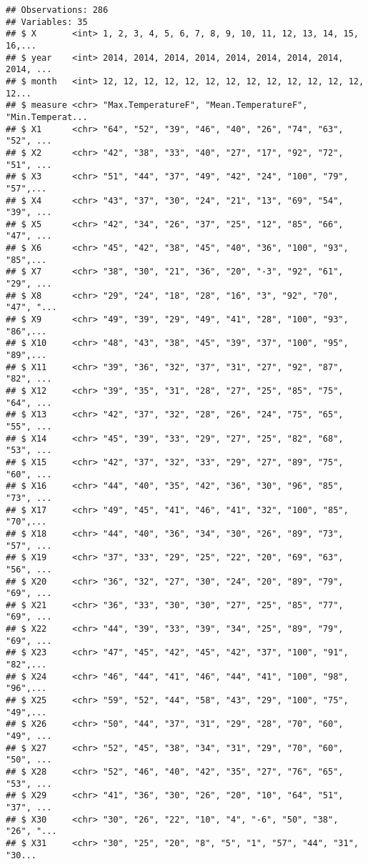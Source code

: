 \documentclass[]{article}
\begin{document}
\begin{verbatim}
## Observations: 286
## Variables: 35
## $ X       <int> 1, 2, 3, 4, 5, 6, 7, 8, 9, 10, 11, 12, 13, 14, 15, 16,...
## $ year    <int> 2014, 2014, 2014, 2014, 2014, 2014, 2014, 2014, 2014, ...
## $ month   <int> 12, 12, 12, 12, 12, 12, 12, 12, 12, 12, 12, 12, 12, 12...
## $ measure <chr> "Max.TemperatureF", "Mean.TemperatureF", "Min.Temperat...
## $ X1      <chr> "64", "52", "39", "46", "40", "26", "74", "63", "52", ...
## $ X2      <chr> "42", "38", "33", "40", "27", "17", "92", "72", "51", ...
## $ X3      <chr> "51", "44", "37", "49", "42", "24", "100", "79", "57",...
## $ X4      <chr> "43", "37", "30", "24", "21", "13", "69", "54", "39", ...
## $ X5      <chr> "42", "34", "26", "37", "25", "12", "85", "66", "47", ...
## $ X6      <chr> "45", "42", "38", "45", "40", "36", "100", "93", "85",...
## $ X7      <chr> "38", "30", "21", "36", "20", "-3", "92", "61", "29", ...
## $ X8      <chr> "29", "24", "18", "28", "16", "3", "92", "70", "47", "...
## $ X9      <chr> "49", "39", "29", "49", "41", "28", "100", "93", "86",...
## $ X10     <chr> "48", "43", "38", "45", "39", "37", "100", "95", "89",...
## $ X11     <chr> "39", "36", "32", "37", "31", "27", "92", "87", "82", ...
## $ X12     <chr> "39", "35", "31", "28", "27", "25", "85", "75", "64", ...
## $ X13     <chr> "42", "37", "32", "28", "26", "24", "75", "65", "55", ...
## $ X14     <chr> "45", "39", "33", "29", "27", "25", "82", "68", "53", ...
## $ X15     <chr> "42", "37", "32", "33", "29", "27", "89", "75", "60", ...
## $ X16     <chr> "44", "40", "35", "42", "36", "30", "96", "85", "73", ...
## $ X17     <chr> "49", "45", "41", "46", "41", "32", "100", "85", "70",...
## $ X18     <chr> "44", "40", "36", "34", "30", "26", "89", "73", "57", ...
## $ X19     <chr> "37", "33", "29", "25", "22", "20", "69", "63", "56", ...
## $ X20     <chr> "36", "32", "27", "30", "24", "20", "89", "79", "69", ...
## $ X21     <chr> "36", "33", "30", "30", "27", "25", "85", "77", "69", ...
## $ X22     <chr> "44", "39", "33", "39", "34", "25", "89", "79", "69", ...
## $ X23     <chr> "47", "45", "42", "45", "42", "37", "100", "91", "82",...
## $ X24     <chr> "46", "44", "41", "46", "44", "41", "100", "98", "96",...
## $ X25     <chr> "59", "52", "44", "58", "43", "29", "100", "75", "49",...
## $ X26     <chr> "50", "44", "37", "31", "29", "28", "70", "60", "49", ...
## $ X27     <chr> "52", "45", "38", "34", "31", "29", "70", "60", "50", ...
## $ X28     <chr> "52", "46", "40", "42", "35", "27", "76", "65", "53", ...
## $ X29     <chr> "41", "36", "30", "26", "20", "10", "64", "51", "37", ...
## $ X30     <chr> "30", "26", "22", "10", "4", "-6", "50", "38", "26", "...
## $ X31     <chr> "30", "25", "20", "8", "5", "1", "57", "44", "31", "30...
\end{verbatim}
\end{document}
